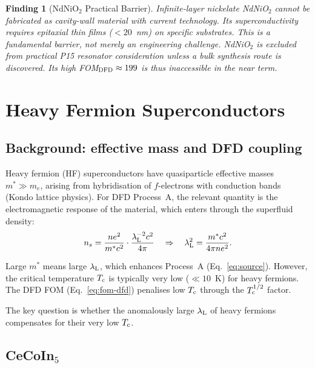 \documentclass[11pt]{article}
\newtheorem{finding}{Finding}
\newcommand{\lambdaL}{\lambda_{\rm L}}
\newcommand{\Tc}{T_{\rm c}}
\newcommand{\mstar}{m^*}
\begin{document}
\begin{finding}[NdNiO$_2$ Practical Barrier]
\label{finding:ndnio2-practical}
Infinite-layer nickelate NdNiO$_2$ cannot be fabricated as cavity-wall
material with current technology. Its superconductivity requires epitaxial
thin films ($< 20$~nm) on specific substrates. This is a fundamental barrier,
not merely an engineering challenge. NdNiO$_2$ is excluded from practical
P15 resonator consideration unless a bulk synthesis route is discovered.
Its high FOM$_{\rm DFD} \approx 199$ is thus inaccessible in the near term.
\end{finding}

\section{Heavy Fermion Superconductors}
\label{sec:hf}

\subsection{Background: effective mass and DFD coupling}

Heavy fermion (HF) superconductors have quasiparticle effective masses
$\mstar \gg m_e$, arising from hybridisation of $f$-electrons with conduction
bands (Kondo lattice physics). For DFD Process~A, the relevant quantity is
the electromagnetic response of the material, which enters through the
superfluid density:
\begin{equation}
n_s = \frac{n e^2}{\mstar c^2} \cdot \frac{\lambdaL^{-2} c^2}{4\pi}
\quad \Rightarrow \quad
\lambdaL^2 = \frac{\mstar c^2}{4\pi n e^2}.
\end{equation}

Large $\mstar$ means large $\lambdaL$, which enhances Process~A
(Eq.~\ref{eq:source}). However, the critical temperature $\Tc$ is typically
very low ($\ll 10$~K) for heavy fermions. The DFD FOM (Eq.~\ref{eq:fom-dfd})
penalises low $\Tc$ through the $\Tc^{1/2}$ factor.

The key question is whether the anomalously large $\lambdaL$ of heavy fermions
compensates for their very low $\Tc$.

\subsection{CeCoIn$_5$}
\end{document}

